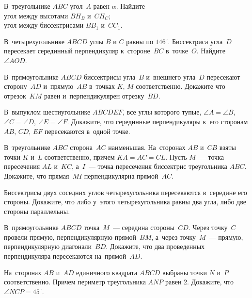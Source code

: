 


\begin{problems}

\item
В~треугольнике $ABC$ угол~$A$ равен $\alpha$.
Найдите
\\
\subproblem угол между высотами $B H_B$ и~$C H_C$;
\\
\subproblem угол между биссектрисами $B B_1$ и~$C C_1$.

\item
В~четырехугольнике $ABCD$ углы $B$ и $C$ равны по $146^{\circ}$.
Биссектриса угла~$D$ пересекает серединный перпендикуляр к~стороне~$BC$
в~точке~$O$.
Найдите $\angle AOD$.

\item
В~прямоугольнике $ABCD$ биссектрисы угла~$B$ и~внешнего угла~$D$ пересекают
сторону~$AD$ и~прямую~$AB$ в~точках $K$, $M$ соответственно.
Докажите что отрезок~$KM$ равен и~перпендикулярен отрезку~$BD$.

\item
В~выпуклом шестиугольнике $ABCDEF$, все углы которого тупые,
$\angle A = \angle B$, $\angle C = \angle D$, $\angle E = \angle F$.
Докажите, что серединные перпендикуляры к~его сторонам $AB$, $CD$, $EF$
пересекаются в~одной точке.

\item
В~треугольнике $ABC$ сторона~$AC$ наименьшая.
На~сторонах $AB$ и~$CB$ взяты точки $K$ и~$L$ соответственно, причем
$KA = AC = CL$.
Пусть $M$~--- точка пересечения $AL$ и~$KC$, а~$I$~--- точка пересечения
биссектрис треугольника $ABC$.
Докажите, что прямая~$MI$ перпендикулярна прямой~$AC$.

\item
Биссектрисы двух соседних углов четырехугольника пересекаются в~середине его
стороны.
Докажите, что либо у~этого четырехугольника равны два угла, либо две стороны
параллельны.

\item
В~прямоугольнике $ABCD$ точка~$M$~--- середина стороны~$CD$.
Через точку~$C$ провели прямую, перпендикулярную прямой~$BM$, а~через
точку~$M$~--- прямую, перпендикулярную диагонали~$BD$.
Докажите, что два проведенных перпендикуляра пересекаются на~прямой~$AD$.

\item
На~сторонах $AB$ и~$AD$ единичного квадрата $ABCD$ выбраны точки $N$ и~$P$
соответственно.
Причем периметр треугольника $ANP$ равен 2.
Докажите, что $\angle NCP = 45^{\circ}$.


\end{problems}

